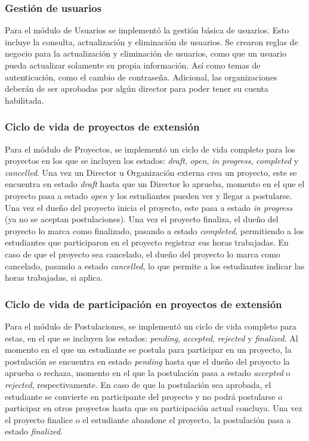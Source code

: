 \subsubsection{Gestión de usuarios}
Para el módulo de Usuarios se implementó la gestión básica de usuarios. Esto incluye la consulta, actualización y eliminación de
usuarios. Se crearon reglas de negocio para la actualización y eliminación de usuarios, como que un usuario pueda actualizar
solamente su propia información. Así como temas de autenticación, como el cambio de contraseña.
Adicional, las organizaciones deberán de ser aprobadas por algún director para poder tener su cuenta habilitada.

\subsubsection{Ciclo de vida de proyectos de extensión}
Para el módulo de Proyectos, se implementó un ciclo de vida completo para los proyectos en los que se incluyen los estados:
\textit{draft}, \textit{open}, \textit{in progress}, \textit{completed} y \textit{cancelled}. Una vez un Director u Organización
externa crea un proyecto, este se encuentra en estado \textit{draft} hasta que un Director lo aprueba, momento en el que el
proyecto pasa a estado \textit{open} y los estudiantes pueden ver y llegar a postularse. Una vez el dueño del proyecto inicia el
proyecto, este pasa a estado \textit{in progress} (ya no se aceptan postulaciones). Una vez el proyecto finaliza, el dueño del
proyecto lo marca como finalizado, pasando a estado \textit{completed}, permitiendo a los estudiantes que participaron en el
proyecto registrar sus horas trabajadas. En caso de que el proyecto sea cancelado, el dueño del proyecto lo marca como cancelado,
pasando a estado \textit{cancelled}, lo que permite a los estudiantes indicar las horas trabajadas, si aplica.

\subsubsection{Ciclo de vida de participación en proyectos de extensión}
Para el módulo de Postulaciones, se implementó un ciclo de vida completo para estas, en el que se incluyen los estados:
\textit{pending}, \textit{accepted}, \textit{rejected} y \textit{finalized}. Al momento en el que un estudiante se postula para
participar en un proyecto, la postulación se encuentra en estado \textit{pending} hasta que el dueño del proyecto la aprueba o
rechaza, momento en el que la postulación pasa a estado \textit{accepted} o \textit{rejected}, respectivamente. En caso de que
la postulación sea aprobada, el estudiante se convierte en participante del proyecto y no podrá postularse o participar en otros
proyectos hasta que su participación actual concluya. Una vez el proyecto finalice o el estudiante abandone el proyecto, la
postulación pasa a estado \textit{finalized}.

